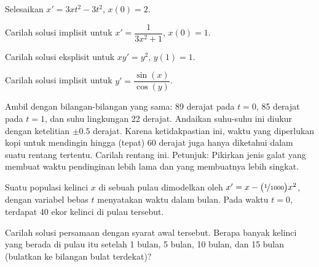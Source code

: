 \begin{exercise}
Selesaikan $x'=3xt^2-3t^2$, $x(0)=2$.
\end{exercise}

\begin{exercise}
Carilah solusi implisit untuk
$x'=\dfrac{1}{3x^2+1}$, $x(0)=1$.
\end{exercise}

\begin{exercise}
Carilah solusi eksplisit untuk $x y' = y^2$, $y(1) = 1$.
\end{exercise}

\begin{exercise}
Carilah solusi implisit untuk $y' = \dfrac{\sin(x)}{\cos(y)}$.
\end{exercise}

\begin{exercise}
Ambil  dengan bilangan-bilangan yang sama: 89 derajat pada
$t=0$, 85 derajat pada $t=1$, dan suhu lingkungan
22 derajat. Andaikan suhu-suhu ini diukur dengan ketelitian
$\pm 0.5$ derajat. Karena ketidakpastian ini, waktu
yang diperlukan kopi untuk mendingin hingga (tepat) 60 derajat juga hanya diketahui dalam
suatu rentang tertentu. Carilah rentang ini. Petunjuk: Pikirkan jenis galat yang membuat
waktu pendinginan lebih lama dan yang membuatnya lebih singkat.
\end{exercise}

\begin{exercise}
Suatu populasi kelinci $x$ di sebuah pulau dimodelkan oleh
$x' = x- \bigl(\nicefrac{1}{1000} \bigr) x^2$, dengan variabel bebas
$t$ menyatakan waktu dalam bulan. Pada waktu $t=0$, terdapat 40 ekor kelinci
di pulau tersebut.
\begin{tasks}
\task Carilah solusi persamaan dengan syarat
awal tersebut.
\task
Berapa banyak kelinci yang berada di pulau itu setelah 1 bulan, 5 bulan,
10 bulan, dan 15 bulan (bulatkan ke bilangan bulat terdekat)?
\end{tasks}
\end{exercise}


